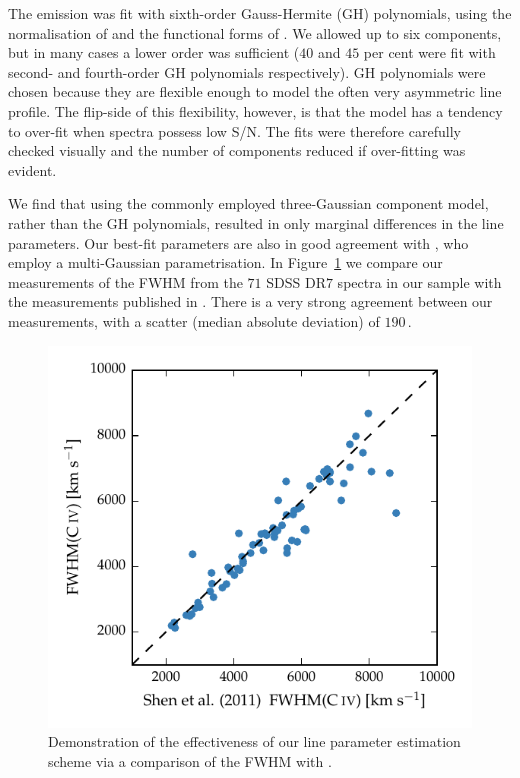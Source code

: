 The  emission was fit with sixth-order Gauss-Hermite (GH) polynomials, using the normalisation of \citet{marel93} and the functional forms of \citet{cappellari02}. 
We allowed up to six components, but in many cases a lower order was sufficient ($40$ and $45$ per cent were fit with second- and fourth-order GH polynomials respectively).
GH polynomials were chosen because they are flexible enough to model the often very asymmetric  line profile. 
The flip-side of this flexibility, however, is that the model has a tendency to over-fit when spectra possess low S/N. 
The fits were therefore carefully checked visually and the number of components reduced if over-fitting was evident.

We find that using the commonly employed three-Gaussian component model, rather than the GH polynomials, resulted in only marginal differences in the line parameters. 
Our best-fit parameters are also in good agreement with \citet{shen11}, who employ a multi-Gaussian parametrisation. 
In Figure~\ref{fig:shen_comparison_civ} we compare our measurements of the  FWHM from the $71$ SDSS DR$7$ spectra in our sample with the measurements published in \citet{shen11}. 
There is a very strong agreement between our measurements, with a scatter (median absolute deviation) of $190$\,\kms. 

\begin{figure}
    \centering 
    \includegraphics[width=0.8\linewidth]{figures/chapter03/shen_comparison_civ.pdf} 
    \caption[{Demonstration of the effectiveness of  line parameter estimation scheme.}]{Demonstration of the effectiveness of our line parameter estimation scheme via a comparison of the  FWHM with \citet{shen11}.} 
    \label{fig:shen_comparison_civ}
\end{figure}

